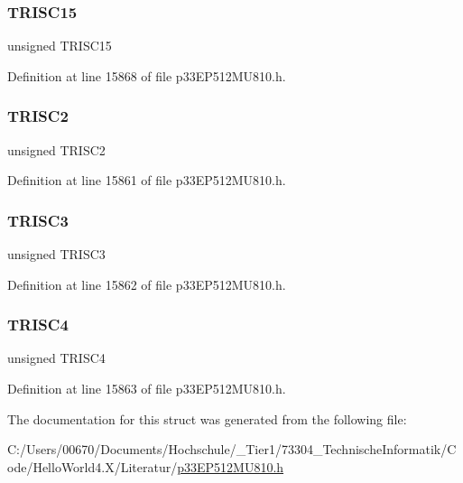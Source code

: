 \subsubsection{\texorpdfstring{T\+R\+I\+S\+C15}{TRISC15}}
{\footnotesize\ttfamily unsigned T\+R\+I\+S\+C15}



Definition at line 15868 of file p33\+E\+P512\+M\+U810.\+h.

\mbox{\label{structtag_t_r_i_s_c_b_i_t_s_abd9996ec4b93a5c2879a5a305b2ddc32}} 
\subsubsection{\texorpdfstring{T\+R\+I\+S\+C2}{TRISC2}}
{\footnotesize\ttfamily unsigned T\+R\+I\+S\+C2}



Definition at line 15861 of file p33\+E\+P512\+M\+U810.\+h.

\mbox{\label{structtag_t_r_i_s_c_b_i_t_s_a327dc42ea095c5655864fd2b5f23a6a6}} 
\subsubsection{\texorpdfstring{T\+R\+I\+S\+C3}{TRISC3}}
{\footnotesize\ttfamily unsigned T\+R\+I\+S\+C3}



Definition at line 15862 of file p33\+E\+P512\+M\+U810.\+h.

\mbox{\label{structtag_t_r_i_s_c_b_i_t_s_af274ba23f40e654e5d022a3601a16389}} 
\subsubsection{\texorpdfstring{T\+R\+I\+S\+C4}{TRISC4}}
{\footnotesize\ttfamily unsigned T\+R\+I\+S\+C4}



Definition at line 15863 of file p33\+E\+P512\+M\+U810.\+h.



The documentation for this struct was generated from the following file\+:\begin{DoxyCompactItemize}
\item 
C\+:/\+Users/00670/\+Documents/\+Hochschule/\+\_\+\+Tier1/73304\+\_\+\+Technische\+Informatik/\+Code/\+Hello\+World4.\+X/\+Literatur/\hyperlink{p33_e_p512_m_u810_8h}{p33\+E\+P512\+M\+U810.\+h}\end{DoxyCompactItemize}
